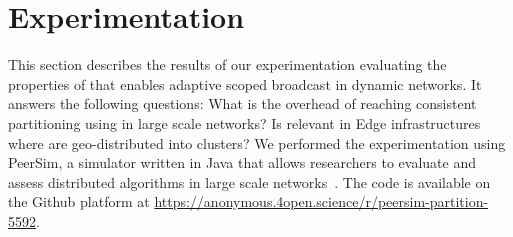 
\section{Experimentation}
\label{sec:experimentation}

This section describes the results of our experimentation evaluating
the properties of \NAME that enables adaptive scoped broadcast in
dynamic networks. It answers the following questions: What is the
overhead of reaching consistent partitioning using \NAME in large
scale networks?  Is \NAME relevant in Edge infrastructures where
\processes are geo-distributed into clusters? We performed the
experimentation using PeerSim, a simulator written in Java that allows
researchers to evaluate and assess distributed algorithms in large
scale networks~\cite{montresor2009peersim}. The code is available on
the Github platform at
\url{https://anonymous.4open.science/r/peersim-partition-5592}.


